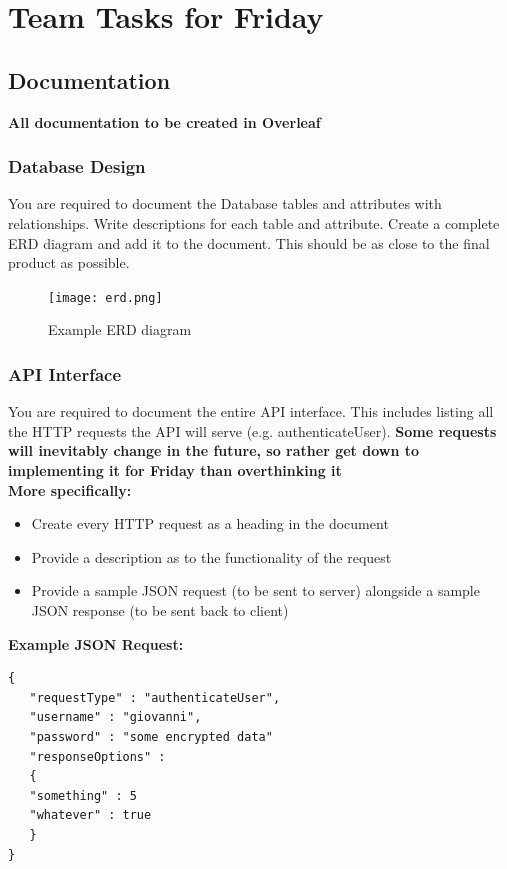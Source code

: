 \documentclass{article}
\begin{document}
\newpage


\section{Team Tasks for Friday}

\subsection{Documentation}
\textbf{All documentation to be created in Overleaf}

\subsubsection{Database Design}
You are required to document the Database tables and attributes with relationships. Write descriptions for each table and attribute. Create a complete ERD diagram and add it to the document. This should be as close to the final product as possible.

\begin{figure}[h]
    \centering
    \texttt{[image: erd.png]}
    \caption{Example ERD diagram}
\end{figure}

\newpage

\subsubsection{API Interface}
You are required to document the entire API interface. This includes listing all the HTTP requests the API will serve (e.g. authenticateUser). \textbf{Some requests will inevitably change in the future, so rather get down to implementing it for Friday than overthinking it}\\

\textbf{More specifically:}
\begin{itemize}
    \item Create every HTTP request as a heading in the document
    \item Provide a description as to the functionality of the request
    \item Provide a sample JSON request (to be sent to server) alongside a sample JSON response (to be sent back to client)
\end{itemize}

\textbf{Example JSON Request:}
\begin{lstlisting}
{
   "requestType" : "authenticateUser",
   "username" : "giovanni",
   "password" : "some encrypted data"
   "responseOptions" : 
   {
   "something" : 5
   "whatever" : true
   }
}
\end{lstlisting}
\end{document}
